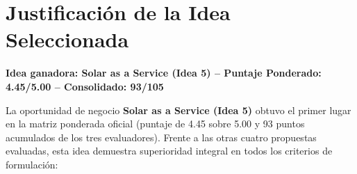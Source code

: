 \documentclass[11pt,a4paper]{article}
\begin{document}
\section{Justificación de la Idea Seleccionada}

\noindent\textbf{\sffamily\color{utpdark}\large Idea ganadora: Solar as a Service (Idea 5) -- Puntaje Ponderado: 4.45/5.00 -- Consolidado: 93/105}

\vspace{0.3cm}

La oportunidad de negocio \textbf{Solar as a Service (Idea 5)} obtuvo el primer lugar en la matriz ponderada oficial (puntaje de 4.45 sobre 5.00 y 93 puntos acumulados de los tres evaluadores). Frente a las otras cuatro propuestas evaluadas, esta idea demuestra superioridad integral en todos los criterios de formulación:
\end{document}
